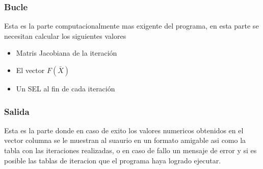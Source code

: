 \documentclass[11pt]{article}
\begin{document}
\subsubsection{Bucle}
Esta es la parte computacionalmente mas exigente del programa, en esta parte se necesitan calcular los siguientes valores
\begin{itemize}
  \item Matris Jacobiana de la iteración
  \item El vector $F(\bar{X})$
  \item Un SEL al fin de cada iteración
\end{itemize}
\subsubsection{Salida}
Esta es la parte donde en caso de exito los valores numericos obtenidos en el vector columna se le muestran al suaurio en un formato amigable asi como la tabla con las iteraciones realizadas, o en caso de fallo un mensaje de error y si es posible las tablas de iteracion que el programa haya logrado ejecutar.  
\clearpage

\nocite{*}

\end{document}
